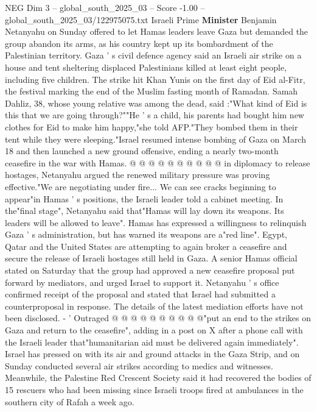 \begin{textsample}{NEG Dim 3 – global\_south\_2025\_03 – Score -1.00 – global\_south\_2025\_03/122975075.txt}  \label{ex:f3_neg_426}
Israeli Prime \textbf{Minister} Benjamin Netanyahu on Sunday offered to let Hamas leaders leave Gaza but demanded the group abandon its arms, as his country kept up its bombardment of the Palestinian territory.
Gaza ' s civil defence agency said an Israeli air strike on a house and tent sheltering displaced Palestinians killed at least eight people, including five children.
The strike hit Khan Yunis on the first day of Eid al-Fitr, the festival marking the end of the Muslim fasting month of Ramadan.
Samah Dahliz, 38, whose young relative was among the dead, said :"What kind of Eid is this that we are going through?""He ' s a child, his parents had bought him new clothes for Eid to make him happy,"she told AFP."They bombed them in their tent while they were sleeping."Israel resumed intense bombing of Gaza on March 18 and then launched a new ground offensive, ending a nearly two-month ceasefire in the war with Hamas. @ @ @ @ @ @ @ @ @ @ in diplomacy to release hostages, Netanyahu argued the renewed military pressure was proving effective."We are negotiating under fire...
We can see cracks beginning to appear"in Hamas ' s positions, the Israeli leader told a cabinet meeting.
In the"final stage", Netanyahu said that"Hamas will lay down its weapons.
Its leaders will be allowed to leave".
Hamas has expressed a willingness to relinquish Gaza ' s administration, but has warned its weapons are a"red line".
Egypt, Qatar and the United States are attempting to again broker a ceasefire and secure the release of Israeli hostages still held in Gaza.
A senior Hamas official stated on Saturday that the group had approved a new ceasefire proposal put forward by mediators, and urged Israel to support it.
Netanyahu ' s office confirmed receipt of the proposal and stated that Israel had submitted a counterproposal in response.
The details of the latest mediation efforts have not been disclosed. - ' Outraged @ @ @ @ @ @ @ @ @ @"put an end to the strikes on Gaza and return to the ceasefire", adding in a post on X after a phone call with the Israeli leader that"humanitarian aid must be delivered again immediately".
Israel has pressed on with its air and ground attacks in the Gaza Strip, and on Sunday conducted several air strikes according to medics and witnesses.
Meanwhile, the Palestine Red Crescent Society said it had recovered the bodies of 15 rescuers who had been missing since Israeli troops fired at ambulances in the southern city of Rafah a week ago.

\end{textsample}
